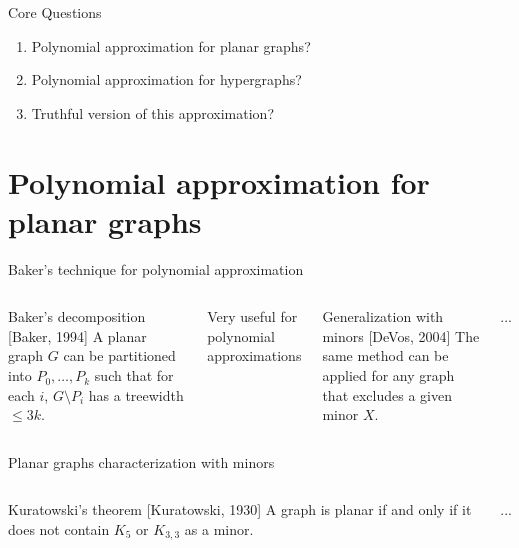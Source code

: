 \documentclass[aspectratio=169]{beamer}
\begin{document}
\begin{frame}{Core Questions}
    \begin{enumerate}
        \item Polynomial approximation for \alert{planar graphs}?
        \item Polynomial approximation for \alert{hypergraphs}?
        \item \alert{Truthful version} of this approximation?
    \end{enumerate}
\end{frame}

{\section{Polynomial approximation for planar graphs}}

\begin{frame}{Baker's technique for polynomial approximation}
    \begin{columns}
        \begin{block}{Baker's decomposition [Baker, 1994]}
            A \alert{planar graph} $G$ can be partitioned into $P_0, \dots, P_k$ such that for each $i$, $G \setminus P_i$ has a \alert{treewidth} $\leqslant 3k$.
        \end{block}

        Very useful for \alert{polynomial approximations}

        \begin{block}{Generalization with minors [DeVos, 2004]}
            The same method can be applied for any graph that \alert{excludes a given minor} $X$.
        \end{block}

        ...
    \end{columns}
\end{frame}

\begin{frame}{Planar graphs characterization with minors}
    \begin{columns}

        \begin{block}{Kuratowski's theorem [Kuratowski, 1930]}
            A graph is planar if and only if it does not contain \alert{$K_5$} or \alert{$K_{3,3}$} as a minor.
        \end{block}

        ...
    \end{columns}
\end{frame}
\end{document}
